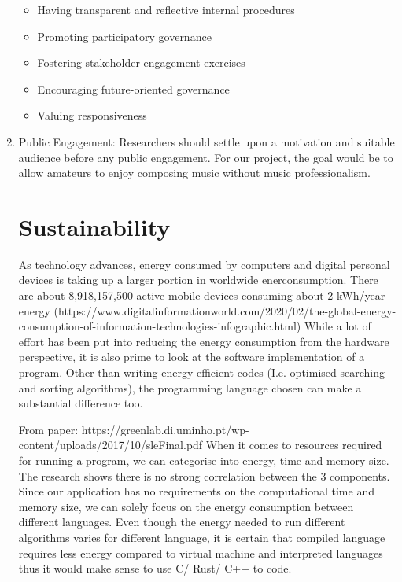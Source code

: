 \begin{enumerate}
\begin{itemize}
        \item Having transparent and reflective internal procedures
        \item Promoting participatory governance
        \item Fostering stakeholder engagement exercises
        \item Encouraging future-oriented governance
        \item Valuing responsiveness
    \end{itemize}
    \item Public Engagement: Researchers should settle upon a motivation and suitable audience before any public engagement. For our project, the goal would be to allow amateurs to enjoy composing music without
    music professionalism.

\section{Sustainability}
As technology advances, energy consumed by computers and digital personal devices is taking up a larger portion in worldwide enerconsumption. There are about 8,918,157,500 active mobile devices consuming about 2 kWh/year energy (https://www.digitalinformationworld.com/2020/02/the-global-energy-consumption-of-information-technologies-infographic.html)
While a lot of effort has been put into reducing the energy consumption from the hardware perspective, it is also prime to look at the software implementation of a program. Other than writing energy-efficient codes (I.e. optimised searching and sorting algorithms), the programming language chosen can make a substantial difference too.

From paper: https://greenlab.di.uminho.pt/wp-content/uploads/2017/10/sleFinal.pdf
When it comes to resources required for running a program, we can categorise into energy, time and memory size. The research shows there is no strong correlation between the 3 components. Since our application has no requirements on the computational time and memory size, we can solely focus on the energy consumption between different languages. Even though the energy needed to run different algorithms varies for different language, it is certain that compiled language requires less energy compared to virtual machine and interpreted languages thus it would make sense to use C/ Rust/ C++ to code.


\end{enumerate}
